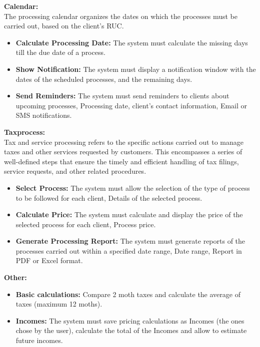 \documentclass[12pt,a4paper, twosite]{article}
\begin{document}
\textbf{Calendar:}\\
The processing calendar organizes the dates on which the processes must be carried out, based on the client's RUC.
\begin{itemize}
\item \textbf {Calculate Processing Date:}
The system must calculate the missing days till the due date of a process.
\end{itemize}
\begin{itemize}
\item \textbf {Show Notification:}
The system must display a notification window with the dates of the scheduled processes, and the remaining days.
\end{itemize}
\begin{itemize}
\item \textbf {Send Reminders:}
The system must send reminders to clients about upcoming processes, Processing date, client's contact information, Email or SMS notifications.
\end{itemize}

\textbf{Taxprocess:}\\
Tax and service processing refers to the specific actions carried out to manage taxes and other services requested by customers. This encompasses a series of well-defined steps that ensure the timely and efficient handling of tax filings, service requests, and other related procedures.
\begin{itemize}
\item \textbf {Select Process:}
The system must allow the selection of the type of process to be followed for each client, Details of the selected process.
\end{itemize}
\begin{itemize}
\item \textbf {Calculate Price:}
The system must calculate and display the price of the selected process for each client, Process price.
\end{itemize}
\begin{itemize}
\item \textbf {Generate Processing Report:}
The system must generate reports of the processes carried out within a specified date range, Date range, Report in PDF or Excel format.
\end{itemize}
\textbf{Other:}
\begin{itemize}
\item \textbf {Basic calculations:}
Compare 2 moth taxes and calculate the average of taxes (maximum 12 moths).
\end{itemize}
\begin{itemize}
\item \textbf {Incomes:}
The system must save pricing calculations as Incomes (the ones chose by the user), calculate the total  of the Incomes and allow to estimate future incomes.
\end{itemize}
\end{document}
